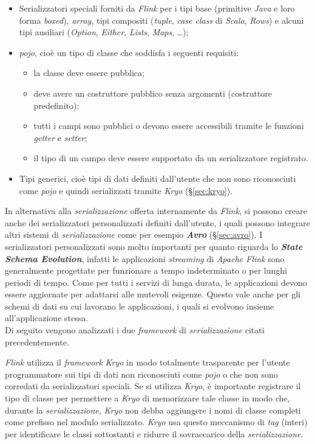 \begin{itemize}
	\item{
Serializzatori speciali forniti da \textit{Flink} per i tipi base (primitive \textit{Java} e loro forma \textit{boxed}), \textit{array}, tipi compositi (\textit{tuple}, \textit{case class} di \textit{Scala}, \textit{Rows}) e alcuni tipi ausiliari (\textit{Option}, \textit{Either}, \textit{Lists}, \textit{Maps}, …);}
	\item{\textit{\gls{pojo}}, cioè un tipo di classe che soddisfa i seguenti requisiti:
\begin{itemize}
	\item{la classe deve essere pubblica;}
	\item{deve avere un costruttore pubblico senza argomenti (costruttore predefinito);}
	\item{tutti i campi sono pubblici o devono essere accessibili tramite le funzioni \textit{getter} e \textit{setter};}
	\item{il tipo di un campo deve essere supportato da un serializzatore registrato.}
\end{itemize}}
	\item{Tipi generici, cioè tipi di dati definiti dall'utente che non sono riconosciuti come \textit{\gls{pojo}} e quindi serializzati tramite \textit{Kryo} (\S\ref{sec:kryo}).}
\end{itemize}
In alternativa alla \textit{\gls{serializzazione}} offerta internamente da \textit{Flink}, si possono creare anche dei serializzatori personalizzati definiti dall'utente, i quali possono integrare altri sistemi di \textit{\gls{serializzazione}} come per esempio \textbf{\textit{Avro}} (\S\ref{sec:avro}). I serializzatori personalizzati sono molto importanti per quanto riguarda lo \textbf{\textit{State Schema Evolution}}, infatti le applicazioni \textit{streaming} di \textit{Apache Flink} sono generalmente progettate per funzionare a tempo indeterminato o per lunghi periodi di tempo. Come per tutti i servizi di lunga durata, le applicazioni devono essere aggiornate per adattarsi alle mutevoli esigenze. Questo vale anche per gli schemi di dati su cui lavorano le applicazioni, i quali si evolvono insieme all'applicazione stessa.\\
Di seguito vengono analizzati i due \textit{\textit{\gls{framework}}} di \textit{\gls{serializzazione}} citati precedentemente.

\label{sec:kryo}
\textit{Flink} utilizza il \textit{\textit{\gls{framework}}} \textit{Kryo} in modo totalmente trasparente per l'utente programmatore sui tipi di dati non riconosciuti come \textit{\gls{pojo}} o che non sono corredati da serializzatori speciali. Se si utilizza \textit{Kryo}, è importante registrare il tipo di classe per permettere a \textit{Kryo} di memorizzare tale classe in modo che, durante la \textit{\gls{serializzazione}}, \textit{Kryo} non debba aggiungere i nomi di classe completi come prefisso nel modulo serializzato. \textit{Kryo} usa questo meccanismo di \textit{tag} (interi) per identificare le classi sottostanti e ridurre il sovraccarico della \textit{\gls{serializzazione}}.



